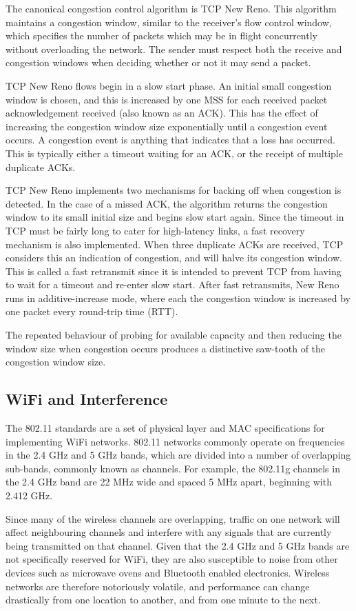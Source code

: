 The canonical congestion control algorithm is TCP New Reno. This algorithm
maintains a congestion window, similar to the receiver's flow control window,
which specifies the number of packets which may be in flight concurrently
without overloading the network. The sender must respect both the receive and
congestion windows when deciding whether or not it may send a packet.

TCP New Reno flows begin in a slow start phase. An initial small congestion
window is chosen, and this is increased by one MSS for each received packet
acknowledgement received (also known as an ACK). This has the effect of
increasing the congestion window size exponentially until a congestion event
occurs. A congestion event is anything that indicates that a loss has occurred.
This is typically either a timeout waiting for an ACK, or the receipt of
multiple duplicate ACKs.

TCP New Reno implements two mechanisms for backing off when congestion is
detected. In the case of a missed ACK, the algorithm returns the congestion
window to its small initial size and begins slow start again. Since the timeout
in TCP must be fairly long to cater for high-latency links, a fast
recovery mechanism is also implemented. When three duplicate ACKs are received,
TCP considers this an indication of congestion, and will halve its congestion
window. This is called a fast retransmit since it is intended to prevent TCP
from having to wait for a timeout and re-enter slow start. After fast
retransmits, New Reno runs in additive-increase mode, where each the congestion
window is increased by one packet every round-trip time (RTT).

The repeated behaviour of probing for available capacity and then reducing the
window size when congestion occurs produces a distinctive saw-tooth of the
congestion window size.

\subsection{WiFi and Interference}
\label{sec:bg:wifi}
The 802.11 standards are a set of physical layer and MAC specifications for
implementing WiFi networks. 802.11 networks commonly operate on frequencies in
the 2.4 GHz and 5 GHz bands, which are divided into a number of overlapping
sub-bands, commonly known as channels. For example, the 802.11g channels in
the 2.4 GHz band are 22 MHz wide and spaced 5 MHz apart, beginning with 2.412
GHz.

Since many of the wireless channels are overlapping, traffic on one network will
affect neighbouring channels and interfere with any signals that are currently
being transmitted on that channel. Given that the 2.4 GHz and 5 GHz bands are
not specifically reserved for WiFi, they are also susceptible to noise from
other devices such as microwave ovens and Bluetooth enabled electronics.
Wireless networks are therefore notoriously volatile, and performance can change
drastically from one location to another, and from one minute to the next.

